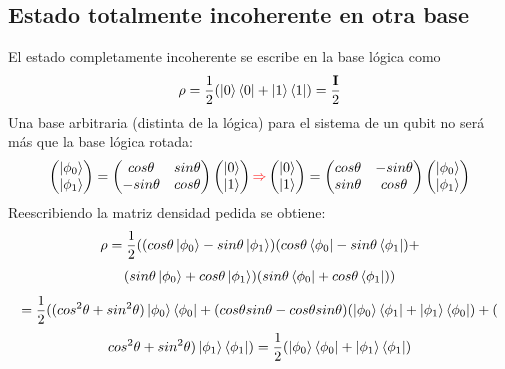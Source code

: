 \documentclass{book}
\begin{document}
\subsection{Estado totalmente incoherente en otra base} El estado completamente incoherente se escribe en la base lógica como 
$$ \rho=\frac{1}{2}(\ket{0}\bra{0}+\ket{1}\bra{1})=\frac{\mathbf{I}}{2}$$
Una base arbitraria (distinta de la lógica) para el sistema de un qubit no será más que la base lógica rotada:
$$ \begin{pmatrix}\ket{\phi_0}\\ \ket{\phi_1}\end{pmatrix}= 
 \begin{pmatrix} cos \theta& sin\theta\\ -sin\theta& cos\theta\end{pmatrix} \begin{pmatrix} \ket{0}\\\ket{1} \end{pmatrix} \textcolor{red}{\Rightarrow}  \begin{pmatrix}\ket{0}\\ \ket{1}\end{pmatrix}= 
 \begin{pmatrix} cos \theta& -sin\theta\\ sin\theta& cos\theta\end{pmatrix} \begin{pmatrix} \ket{\phi_0}\\\ket{\phi_1} \end{pmatrix}$$
 Reescribiendo la matriz densidad pedida se obtiene: 
 $$ \rho=\frac{1}{2}((cos\theta\ket{\phi_0}-sin\theta\ket{\phi_1})(cos\theta\bra{\phi_0}-sin\theta\bra{\phi_1})+ $$ $$(sin\theta\ket{\phi_0}+cos\theta\ket{\phi_1})(sin\theta\bra{\phi_0}+cos\theta\bra{\phi_1}))$$
 $$ =\frac{1}{2}((cos^2\theta+sin^2\theta)\ket{\phi_0}\bra{\phi_0}+(cos\theta sin\theta-cos\theta sin\theta)(\ket{\phi_0}\bra{\phi_1}+\ket{\phi_1}\bra{\phi_0})+($$ $$cos^2\theta+sin^2\theta)\ket{\phi_1}\bra{\phi_1})=\frac{1}{2}(\ket{\phi_0}\bra{\phi_0}+\ket{\phi_1}\bra{\phi_1})$$
\end{document}
